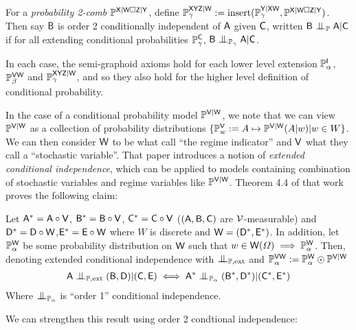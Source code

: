 For a \emph{probability 2-comb} $\mathbb{P}^{\mathsf{X}|\mathsf{W}\square\mathsf{Z}|\mathsf{Y}}$, define $\mathbb{P}_\gamma^{\mathsf{XYZ}|\mathsf{W}}:=\text{insert}(\mathbb{P}_\gamma^{\mathsf{Y}|\mathsf{XW}}, \mathbb{P}^{\mathsf{X}|\mathsf{W}\square\mathsf{Z}|\mathsf{Y}})$. Then say $\mathsf{B}$ is order 2 conditionally independent of $\mathsf{A}$ given $\mathsf{C}$, written $\RV{B}\CI_{\prob{P}}\RV{A}|\RV{C}$ if for all extending conditional probabilities $\mathbb{P}_\gamma^{\mathsf{C}}$, $\RV{B}\CI_{\prob{P}_\gamma}\RV{A}|\RV{C}$.

In each case, the semi-graphoid axioms hold for each lower level extension $\mathbb{P}^{\mathsf{I}}_\alpha$, $\mathbb{P}^{\mathsf{VW}}_\beta$ and $\mathbb{P}_\gamma^{\mathsf{XYZ}|\mathsf{W}}$, and so they also hold for the higher level definition of conditional probability.

In the case of a conditional probability model $\mathbb{P}^{\mathsf{V}|\mathsf{W}}$, we note that we can view $\mathbb{P}^{\mathsf{V}|\mathsf{W}}$ as a collection of probability distributions $\{\mathbb{P}^{\mathsf{V}}_w:=A\mapsto \mathbb{P}^{\mathsf{V}|\mathsf{W}}(A|w)|w\in W\}$. We can then consider $\mathsf{W}$ to be what \citet{constantinou_extended_2017} call ``the regime indicator'' and $\mathsf{V}$ what they call a ``stochastic variable''. That paper introduces a notion of \emph{extended conditional independence}, which can be applied to models containing combination of stochastic variables and regime variables like $\mathbb{P}^{\mathsf{V}|\mathsf{W}}$.  Theorem 4.4 of that work proves the following claim:

\begin{theorem}\label{th:dawid_constantionou}
Let $\mathsf{A}^*=\mathsf{A}\circ \mathsf{V}$, $\mathsf{B}^*=\mathsf{B}\circ\mathsf{V}$, $\mathsf{C}^*=\mathsf{C}\circ \mathsf{V}$ ($(\mathsf{A},\mathsf{B},\mathsf{C})$ are $\mathcal{V}$-measurable) and $\mathsf{D}^*=\mathsf{D}\circ \mathsf{W}$,$\mathsf{E}^*=\mathsf{E}\circ \mathsf{W}$ where $W$ is discrete and $\mathsf{W}=(\mathsf{D}^*,\mathsf{E}^*)$. In addition, let $\mathbb{P}_\alpha^{\mathsf{W}}$ be some probability distribution on $\mathsf{W}$ such that $w\in\mathsf{W}(\Omega)\implies \mathbb{P}_\alpha^{\mathsf{W}}$. Then, denoting extended conditional independence with $\CI_{\prob{P},\text{ext}}$ and $\mathbb{P}_\alpha^{\mathsf{VW}}:=\mathbb{P}_\alpha^{\mathsf{W}}\odot \mathbb{P}^{\mathsf{V}|\mathsf{W}}$
\begin{align}
	\RV{A}\CI_{\prob{P},\text{ext}}(\RV{B},\RV{D})|(\RV{C},\RV{E})\iff \RV{A}^*\CI_{\prob{P}_\alpha}(\RV{B}^*,\RV{D}^*)|(\RV{C}^*,\RV{E}^*)
\end{align}
Where $\CI_{\prob{P}_\alpha}$ is ``order 1'' conditional independence.
\end{theorem}

We can strengthen this result using order 2 condtional independence:

